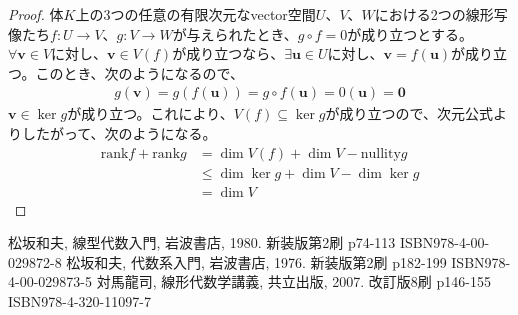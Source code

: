 \documentclass[dvipdfmx]{jsarticle}
\begin{document}
\begin{proof}
体$K$上の3つの任意の有限次元なvector空間$U$、$V$、$W$における2つの線形写像たち$f:U \rightarrow V$、$g:V \rightarrow W$が与えられたとき、$g \circ f = 0$が成り立つとする。$\forall\mathbf{v} \in V$に対し、$\mathbf{v} \in V(f)$が成り立つなら、$\exists\mathbf{u} \in U$に対し、$\mathbf{v} = f\left( \mathbf{u} \right)$が成り立つ。このとき、次のようになるので、
\begin{align*}
g\left( \mathbf{v} \right) = g\left( f\left( \mathbf{u} \right) \right) = g \circ f\left( \mathbf{u} \right) = 0\left( \mathbf{u} \right) = \mathbf{0}
\end{align*}
$\mathbf{v} \in \ker g$が成り立つ。これにより、$V(f) \subseteq \ker g$が成り立つので、次元公式よりしたがって、次のようになる。
\begin{align*}
{\mathrm{rank}}f + {\mathrm{rank}}g &= \dim{V(f)} + \dim V - {\mathrm{nullity}}g\\
&\leq \dim{\ker g} + \dim V - \dim{\ker g}\\
&= \dim V
\end{align*}
\end{proof}
\begin{thebibliography}{50}
    松坂和夫, 線型代数入門, 岩波書店, 1980. 新装版第2刷 p74-113 ISBN978-4-00-029872-8
    松坂和夫, 代数系入門, 岩波書店, 1976. 新装版第2刷 p182-199 ISBN978-4-00-029873-5
    対馬龍司, 線形代数学講義, 共立出版, 2007. 改訂版8刷 p146-155 ISBN978-4-320-11097-7
\end{thebibliography}
\end{document}

